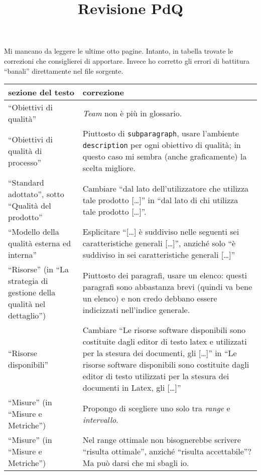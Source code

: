 \documentclass[a4paper]{article}
\title{Revisione PdQ}
\author{\GG}
\begin{document}
\maketitle

\paragraph{}
Mi mancano da leggere le ultime otto pagine. Intanto, in tabella trovate le correzioni che consiglierei di apportare. Invece ho corretto gli errori di battitura “banali” direttamente nel file sorgente.

\begin{table}
\begin{tabular}{| p{3cm} | p{10cm} |}
	\hline
	\textbf{sezione del testo} & \textbf{correzione} \\ \hline
	\hline
	“Obiettivi di qualità” & \emph{Team} non è più in glossario. \\ \hline
	“Obiettivi di qualità di processo” & Piuttosto di \texttt{subparagraph}, usare l'ambiente \texttt{description} per ogni obiettivo di qualità; in questo caso mi sembra (anche graficamente) la scelta migliore. \\ \hline
	“Standard adottato”, sotto “Qualità del prodotto” & Cambiare “dal lato dell’utilizzatore che utilizza tale prodotto [\dots]” in “dal lato di chi utilizza tale prodotto [\dots]”. \\ \hline
	“Modello della qualità esterna ed interna” & Esplicitare “[\dots] è suddiviso nelle seguenti sei caratteristiche generali [\dots]”, anziché solo “è suddiviso in sei caratteristiche generali [\dots]” \\ \hline
	“Risorse” (in “La strategia di gestione della qualità nel dettaglio”) & Piuttosto dei paragrafi, usare un elenco: questi paragrafi sono abbastanza brevi (quindi va bene un elenco) e non credo debbano essere indicizzati nell'indice generale. \\ \hline
	“Risorse disponibili” & Cambiare “Le risorse software disponibili sono costituite dagli editor di testo latex e utilizzati per la stesura dei documenti, gli \gloss{IDE} [\dots]” in “Le risorse software disponibili sono costituite dagli editor di testo utilizzati per la stesura dei documenti in Latex, gli \gloss{IDE} [\dots]” \\ \hline
	“Misure” (in “Misure e Metriche”) & Propongo di scegliere uno solo tra \emph{range} e \emph{intervallo}. \\ \hline
	“Misure” (in “Misure e Metriche”) & Nel range ottimale non bisognerebbe scrivere “risulta ottimale”, anziché “risulta accettabile”? Ma può darsi che mi sbagli io. \\ \hline

\end{tabular}
\end{table}
\end{document}

